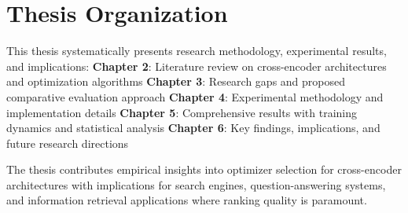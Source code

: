 \section{Thesis Organization}

This thesis systematically presents research methodology, experimental results, and implications:
\textbf{Chapter 2}: Literature review on cross-encoder architectures and optimization algorithms
\textbf{Chapter 3}: Research gaps and proposed comparative evaluation approach  
\textbf{Chapter 4}: Experimental methodology and implementation details
\textbf{Chapter 5}: Comprehensive results with training dynamics and statistical analysis
\textbf{Chapter 6}: Key findings, implications, and future research directions

The thesis contributes empirical insights into optimizer selection for cross-encoder architectures with implications for search engines, question-answering systems, and information retrieval applications where ranking quality is paramount.
